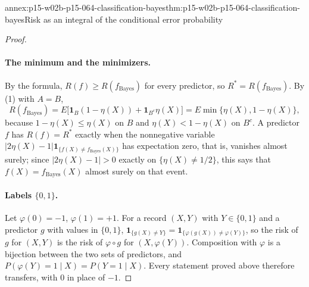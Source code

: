 \begin{annexitem}{annex:p15-w02b-p15-064-classification-bayes}{thm:p15-w02b-p15-064-classification-bayes}{Risk as an integral of the conditional error probability}
\begin{proof}
\paragraph{The minimum and the minimizers.}
By the formula, \(R(f)\geq R(f_{\mathrm{Bayes}})\) for every predictor, so
\(R^{*}=R(f_{\mathrm{Bayes}})\). By (1) with \(A=B\),
\[
 R(f_{\mathrm{Bayes}})=E\bigl[\mathbf1_B(1-\eta(X))+\mathbf1_{B^c}\eta(X)\bigr]
 =E\min\{\eta(X),1-\eta(X)\},
\]
because \(1-\eta(X)\leq\eta(X)\) on \(B\) and \(\eta(X)<1-\eta(X)\) on
\(B^c\). A predictor \(f\) has \(R(f)=R^{*}\) exactly when the nonnegative
variable \(|2\eta(X)-1|\mathbf1_{\{f(X)\neq f_{\mathrm{Bayes}}(X)\}}\) has
expectation zero, that is, vanishes almost surely; since \(|2\eta(X)-1|>0\)
exactly on \(\{\eta(X)\neq1/2\}\), this says that \(f(X)=f_{\mathrm{Bayes}}(X)\)
almost surely on that event.

\paragraph{Labels \(\{0,1\}\).}
Let \(\varphi(0)=-1\), \(\varphi(1)=+1\). For a record \((X,Y)\) with
\(Y\in\{0,1\}\) and a predictor \(g\) with values in \(\{0,1\}\),
\(\mathbf1_{\{g(X)\neq Y\}}=\mathbf1_{\{\varphi(g(X))\neq\varphi(Y)\}}\), so
the risk of \(g\) for \((X,Y)\) is the risk of \(\varphi\circ g\) for
\((X,\varphi(Y))\). Composition with \(\varphi\) is a bijection between the
two sets of predictors, and \(P(\varphi(Y)=1\mid X)=P(Y=1\mid X)\). Every
statement proved above therefore transfers, with \(0\) in place of \(-1\).
\end{proof}
\end{annexitem}

